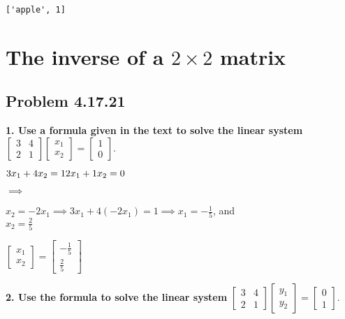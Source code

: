 \documentclass[
  letterpaper,
  DIV=11,
  numbers=noendperiod]{scrartcl}
\begin{document}
\begin{verbatim}
['apple', 1]
\end{verbatim}

\newpage{}

\hypertarget{the-inverse-of-a-2-times-2-matrix}{%
\section{\texorpdfstring{The inverse of a \(2 \times 2\)
matrix}{The inverse of a 2 \textbackslash times 2 matrix}}\label{the-inverse-of-a-2-times-2-matrix}}

\hypertarget{problem-4.17.21}{%
\subsection{Problem 4.17.21}\label{problem-4.17.21}}

\textbf{1. Use a formula given in the text to solve the linear system}
\(\begin{bmatrix} 3 & 4 \\ 2 & 1 \end{bmatrix} \begin{bmatrix} x_1 \\ x_2 \end{bmatrix} = \begin{bmatrix} 1 \\ 0 \end{bmatrix}\).

\(3x_1 + 4x_2 = 1\\2x_1 + 1x_2 = 0\)

\(\implies\)

\(x_2 = -2x_1 \implies 3x_1 + 4(-2x_1) = 1 \implies x_1 = -\frac{1}{5}\),
and\\
\(x_2 = \frac{2}{5}\)

\(\begin{bmatrix}x_1\\x_2\end{bmatrix} = \begin{bmatrix}-\frac{1}{5}\\\frac{2}{5}\end{bmatrix}\)

\textbf{2. Use the formula to solve the linear system}
\(\begin{bmatrix} 3 & 4 \\ 2 & 1 \end{bmatrix} \begin{bmatrix} y_1 \\ y_2 \end{bmatrix} = \begin{bmatrix} 0 \\ 1 \end{bmatrix}\).
\end{document}
